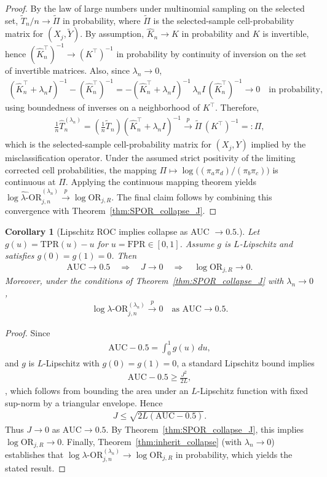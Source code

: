 \documentclass[pdflatex,sn-mathphys-num]{sn-jnl}%
\def\EQSP{3pt}
\newcommand{\cgather}[2][\EQSP]{\begingroup\setlength\abovedisplayskip{#1}\setlength\belowdisplayskip{#1}\begin{gather} #2 \end{gather}\endgroup\noindent}
\theoremstyle{thmstyleone}%
\newtheorem{corollary}[theorem]{Corollary} %
\theoremstyle{thmstyletwo}%
\theoremstyle{thmstylethree}%
\begin{document}
%
\begin{proof}
By the law of large numbers under multinomial sampling on the selected set, $\tilde T_n/n \to \tilde\Pi$ in probability, where
$\tilde\Pi$ is the selected-sample cell-probability matrix for $(X_j,\tilde Y)$.
By assumption, $\hat K_n\to K$ in probability and $K$ is invertible, hence
$(\hat K_n^\top)^{-1}\to (K^\top)^{-1}$ in probability by continuity of inversion on the set of invertible matrices.
Also, since $\lambda_n\to 0$,
\cgather{
(\hat K_n^\top+\lambda_n I)^{-1} - (\hat K_n^\top)^{-1}
= -(\hat K_n^\top+\lambda_n I)^{-1}\,\lambda_n I\,(\hat K_n^\top)^{-1} \to 0
\quad\text{in probability,}
}
using boundedness of inverses on a neighborhood of $K^\top$.
Therefore,
\cgather{
\frac{1}{n}\hat T^{(\lambda_n)}_n
=
\left(\frac{1}{n}\tilde T_n\right)(\hat K_n^\top+\lambda_n I)^{-1} \xrightarrow{p}\tilde\Pi\,(K^\top)^{-1}
=:\Pi,
}
which is the selected-sample cell-probability matrix for $(X_j,Y)$ implied by the misclassification operator.
Under the assumed strict positivity of the limiting corrected cell probabilities, the mapping
$\Pi\mapsto \log\big((\pi_a\pi_d)/(\pi_b\pi_c)\big)$ is continuous at $\Pi$.
Applying the continuous mapping theorem yields
$\widehat{\log\lambda\text{-OR}}_{j,n}^{(\lambda_n)} \xrightarrow{p} \log \mathrm{OR}_{j,R}$.
The final claim follows by combining this convergence with Theorem~\ref{thm:SPOR_collapse_J}.
\end{proof}


\begin{corollary}[Lipschitz ROC implies collapse as AUC $\to 0.5$.]\label{cor:auc_collapse}
Let $g(u)=\mathrm{TPR}(u)-u$ for $u=\mathrm{FPR}\in[0,1]$. 
Assume $g$ is $L$-Lipschitz and satisfies $g(0)=g(1)=0$. 
Then
\cgather{
\mathrm{AUC}\to 0.5 
\quad \Rightarrow \quad 
J \to 0 
\quad \Rightarrow \quad 
\log \mathrm{OR}_{j,R} \to 0.
}
Moreover, under the conditions of Theorem~\ref{thm:SPOR_collapse_J} with $\lambda_n\to 0$,
\cgather{
\log\lambda\text{-OR}^{(\lambda_n)}_{j,n}\xrightarrow{p}0
\quad \text{as } \mathrm{AUC}\to 0.5.
}
\end{corollary}
\begin{proof}
Since
\cgather{
\mathrm{AUC}-0.5=\int_0^1 g(u)\,du,
}
and $g$ is $L$-Lipschitz with $g(0)=g(1)=0$, a standard Lipschitz bound implies
\cgather{
\mathrm{AUC}-0.5 \ge \frac{J^2}{2L},
}, which follows from  bounding the area under an $L$-Lipschitz function with fixed sup-norm by a triangular envelope. Hence
\cgather{
J \le \sqrt{2L(\mathrm{AUC}-0.5)}.
}
Thus $J\to 0$ as $\mathrm{AUC}\to 0.5$. 
By Theorem~\ref{thm:SPOR_collapse_J}, this implies $\log \mathrm{OR}_{j,R}\to 0$.
Finally, Theorem~\ref{thm:inherit_collapse} (with $\lambda_n\to 0$) establishes that
$\log\lambda\text{-OR}^{(\lambda_n)}_{j,n}
\to \log \mathrm{OR}_{j,R}$ in probability,
which yields the stated result.
\end{proof}
\end{document}

